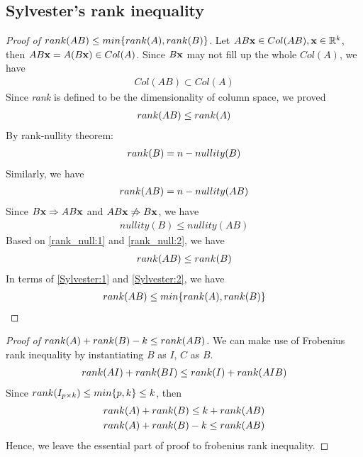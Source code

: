 \documentclass[11pt,a4paper]{report}
\begin{document}
\subsection{Sylvester's rank inequality}
\begin{proof} [Proof of $rank(AB) \leq min\{rank(A),rank(B)\}$]
    Let $AB\mathbf{x} \in Col(AB), \mathbf{x} \in \mathbb{R}^k$, then $AB\mathbf{x} = A(B\mathbf{x}) \in
    Col(A)$. Since $B\mathbf{x}$ may not fill up the whole $Col(A)$, we have
    \begin{align}
        Col(AB) \subset Col(A)
    \end{align}
    Since {\it rank} is defined to be the dimensionality of column space, we
    proved
    \begin{align}
        rank(AB) \leq rank(A) \label{Sylvester:1}
    \end{align}
    By rank-nullity theorem:
    \begin{align}
        rank(B) = n - nullity(B) \label{rank_null:1}
    \end{align}
    Similarly, we have
    \begin{align}
        rank(AB) = n - nullity(AB) \label{rank_null:2}
    \end{align}
    Since $B\mathbf{x} \Rightarrow AB\mathbf{x}$ and $AB\mathbf{x} \not \Rightarrow B\mathbf{x}$, we have 
    \begin{align}
        nullity(B) \leq nullity(AB)
    \end{align}
    Based on \eqref{rank_null:1} and \eqref{rank_null:2}, we have 
    \begin{align}
        rank(AB) \leq rank(B) \label{Sylvester:2}
    \end{align}
    In terms of \eqref{Sylvester:1} and \eqref{Sylvester:2}, we have
    \begin{align}
        rank(AB) \leq min\{rank(A),rank(B)\} \label{Sylvester:3}
    \end{align}
\end{proof}
\begin{proof} [Proof of $rank(A) + rank(B) - k \leq rank(AB)$]
    We can make use of Frobenius rank inequality by instantiating $B$ as $I$,
    $C$ as $B$.
    \begin{align}
        rank(A I) + rank(B I) \leq rank(I) + rank(AIB) 
    \end{align}
    Since  $rank(I_{p \times k}) \leq min\{p, k\} \leq k$, then
    \begin{align}
        rank(A) + rank(B) \leq k + rank(AB) \\
        rank(A) + rank(B) -k \leq rank(AB)
    \end{align}
    Hence, we leave the essential part of proof to frobenius rank inequality.
\end{proof}
\end{document}

